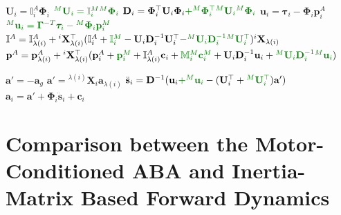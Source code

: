 \begin{algorithm}
\begin{algorithmic}[1]
        \item[]
        \State $\mathbf{U}_i = \mathbb{I} _i ^A \boldsymbol{\Phi}_i$
        \State $\color{webgreen}{{}^M\mathbf{U}_i = \mathbb{I} _i ^M {}^M\boldsymbol{\Phi}_i}$
        \State $\mathbf{D} _i = \boldsymbol{\Phi} ^\top _i  {} \mathbf{U} _i \boldsymbol{\Phi} _i \textcolor{webgreen}{+ {} ^M\boldsymbol{\Phi} ^\top _i  {} ^M\mathbf{U} _i {} ^M\boldsymbol{\Phi} _i}$
        \State $\mathbf{u}_i = \boldsymbol{\tau}_i - \boldsymbol{\Phi}_i\mathbf{p}_i^A$
        \State $\color{webgreen}{{}^M\mathbf{u}_i = \boldsymbol{\Gamma}^{-T}\boldsymbol{\tau}_i - {}^M\boldsymbol{\Phi}_i\mathbf{p}_i^M}$
        \State $\mathbb{I} ^A = \mathbb{I} ^A _{\lambda (i)} + {}^i\mathbf{X} _{\lambda (i)} ^\top (\mathbb{I} _i ^A + \textcolor{webgreen}{\mathbb{I} _i ^M } - {}  \mathbf{U} _i  \mathbf{D} ^{-1} _i  {}  \mathbf{U} ^\top _i \textcolor{webgreen}{- {} ^M \mathbf{U} _i  \mathbf{D} ^{-1} _i {} ^M \mathbf{U} ^\top _i}) {} ^i \mathbf{X} _{\lambda (i)} $
        \State $\mathbf{p} ^A = \mathbf{p} ^A _{\lambda (i)} + {}^i\mathbf{X} _{\lambda (i)} ^\top (\mathbf{p} ^A_i + \textcolor{webgreen}{\mathbf{p} ^M_i } + \mathbb{I} ^A _{\lambda (i)}  \mathbf{c}_i + \textcolor{webgreen}{\mathbb{M} {} ^M _i \mathbf{c} ^M _i }+ {}  \mathbf{U} _i \mathbf{D} ^{-1} _i {} \mathbf{u} _i + \textcolor{webgreen}{{} ^M \mathbf{U} _i \mathbf{D} ^{-1} _i {} ^M\mathbf{u} _i}) $
        \EndIf
        \EndFor

        \item[]
        \State $\mathbf{a}' = -\mathbf{a}_g$
        \Else
        \State $\mathbf{a}' = {}^{\lambda(i)}\mathbf{X}_i \mathbf{a}_{\lambda(i)}$
        \State $\ddot{\mathbf{s}}_i = \mathbf{D}^{-1} (\mathbf{u}_i \textcolor{webgreen}{+ {}^M\mathbf{u}_i }- (\mathbf{U}_i^\top + \textcolor{webgreen}{{}^M\mathbf{U}_i^\top})\mathbf{a}')$
        \State $\mathbf{a}_i = \mathbf{a}' + \boldsymbol{\Phi}_i\mathbf{\ddot{s}}_i + \mathbf{c} _i$
        \EndIf
        \EndFor
    \end{algorithmic}
\end{algorithm}

\section{Comparison between the Motor-Conditioned ABA and Inertia-Matrix Based Forward Dynamics}

